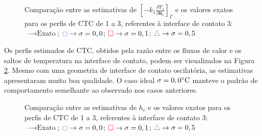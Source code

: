\begin{figure}[H]
	\caption{Comparação entre as estimativas de $\left[-k_1 \frac{\partial T_1}{\partial\mathbf{n}_1}\right]_\Gamma$ e os valores exatos para os perfis de CTC de 1 a 3, referentes à interface de contato 3: $\text{--} \rightarrow \text{Exato}$; $\textcolor{blue}{\ocircle} \rightarrow \sigma = 0,0$; $\textcolor{red}{\square} \rightarrow \sigma = 0,1$; $\textcolor{gray}{\triangle} \rightarrow \sigma = 0,5$}
	\label{figura_fluxo_calor_interface_03}
\end{figure}
%
%

Os perfis estimados de CTC, obtidos pela razão entre os fluxos de calor e os saltos de temperatura na interface de contato, podem ser visualizados na Figura \ref{figura_ctc_interface_03}. Mesmo com uma geometria de interface de contato oscilatória, as estimativas apresentaram muito boa qualidade. O caso ideal $\sigma = 0,0\celsius$ manteve o padrão de comportamento semelhante ao observado nos casos anteriores.

\begin{figure}[H]
	\caption{Comparação entre as estimativas de $h_c$ e os valores exatos para os perfis de CTC de 1 a 3, referentes à interface de contato 3: $\text{--} \rightarrow \text{Exato}$; $\textcolor{blue}{\ocircle} \rightarrow \sigma = 0,0$; $\textcolor{red}{\square} \rightarrow \sigma = 0,1$; $\textcolor{gray}{\triangle} \rightarrow \sigma = 0,5$}
	\label{figura_ctc_interface_03}
\end{figure}

